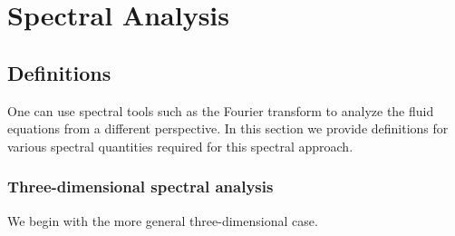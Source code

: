 \documentclass[oneside,a4paper,11pt]{report}
\begin{document}
%
\chapter{Spectral Analysis}
%

\section{Definitions}
One can use spectral tools such as the Fourier transform to analyze the fluid equations from a different perspective. In this section we provide definitions for various spectral quantities required for this spectral approach. 

\subsection{Three-dimensional spectral analysis}
We begin with the more general three-dimensional case.
\end{document}
